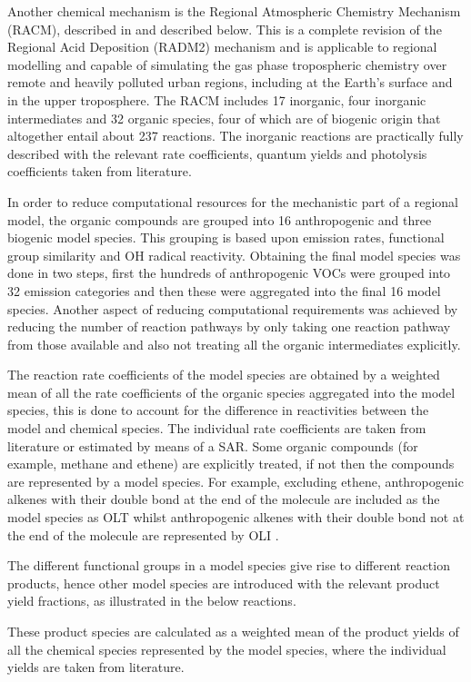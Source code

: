 Another chemical mechanism is the Regional Atmospheric Chemistry Mechanism (RACM), described in \citep{Stockwell:1997} and described below. 
This is a complete revision of the Regional Acid Deposition (RADM2) mechanism and is applicable to regional modelling and capable of simulating the gas phase tropospheric chemistry over remote and heavily polluted urban regions, including at the Earth's surface and in the upper troposphere. 
The RACM includes 17 inorganic, four inorganic intermediates and 32 organic species, four of which are of biogenic origin that altogether entail about 237 reactions. 
The inorganic reactions are practically fully described with the relevant rate coefficients, quantum yields and photolysis coefficients taken from literature.

In order to reduce computational resources for the mechanistic part of a regional model, the organic compounds are grouped into 16 anthropogenic and three biogenic model species. 
This grouping is based upon emission rates, functional group similarity and OH radical reactivity. 
Obtaining the final model species was done in two steps, first the hundreds of anthropogenic VOCs were grouped into 32 emission categories and then these were aggregated into the final 16 model species. 
Another aspect of reducing computational requirements was achieved by reducing the number of reaction pathways by only taking one reaction pathway from those available and also not treating all the organic intermediates explicitly.

The reaction rate coefficients of the model species are obtained by a weighted mean of all the rate coefficients of the organic species aggregated into the model species, this is done to account for the difference in reactivities between the model and chemical species. 
The individual rate coefficients are taken from literature or estimated by means of a SAR. 
Some organic compounds (for example, methane and ethene) are explicitly treated, if not then the compounds are represented by a model species. 
For example, excluding ethene, anthropogenic alkenes with their double bond at the end of the molecule are included as the model species as OLT whilst anthropogenic alkenes with their double bond not at the end of the molecule are represented by OLI \citep{Stockwell:1997}.

The different functional groups in a model species give rise to different reaction products, hence other model species are introduced with the relevant product yield fractions, as illustrated in the below reactions.
\begin{reactionlist}
\end{reactionlist}
These product species are calculated as a weighted mean of the product yields of all the chemical species represented by the model species, where the individual yields are taken from literature. 

